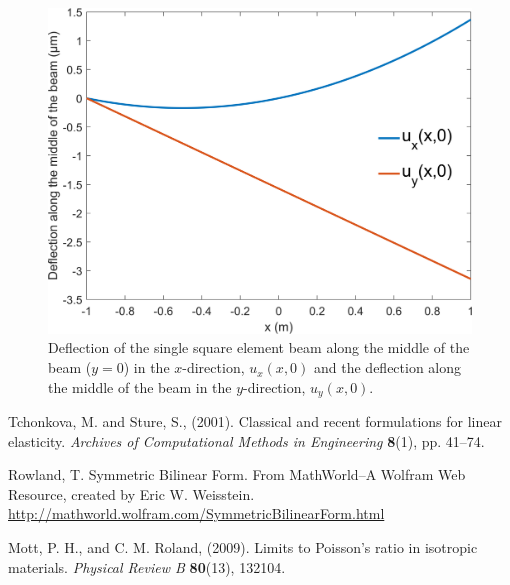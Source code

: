 \documentclass[11pt]{article}
\begin{document}
\begin{figure}[h!]
	\centering
	\includegraphics[width=0.7\linewidth]{q2a_plot.png}
	\caption{Deflection of the single square element beam along the middle of the beam ($y=0$) in the $x$-direction, $u_x(x,0)$ and the deflection along the middle of the beam in the $y$-direction, $u_y(x,0)$.}
	\label{fig:q2a_plot}
\end{figure}

\begin{thebibliography}{9}
Tchonkova, M. and Sture, S., (2001). Classical and recent formulations for linear elasticity. \textit{Archives of Computational Methods in Engineering} \textbf{8}(1), pp. 41--74.

Rowland, T. Symmetric Bilinear Form. From MathWorld--A Wolfram Web Resource, created by Eric W. Weisstein. \url{http://mathworld.wolfram.com/SymmetricBilinearForm.html}

Mott, P. H., and C. M. Roland, (2009). Limits to Poisson's ratio in isotropic materials. \textit{Physical Review B} \textbf{80}(13), 132104.
\end{thebibliography}
\end{document}

